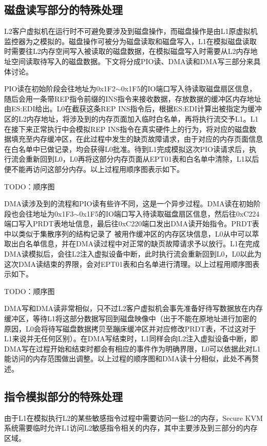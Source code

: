 \subsection{磁盘读写部分的特殊处理}

L2客户虚拟机在运行时不可避免要涉及到磁盘操作，而磁盘操作是由L1原虚拟机监控器为之模拟的。磁盘操作可被分为磁盘读取和磁盘写入，L1在模拟磁盘读取时需要往L2内存空间写入被读取的磁盘数据，在模拟磁盘写入时需要从L2内存地址空间读取待写入的磁盘数据。下文将分成PIO读、DMA读和DMA写三部分来具体讨论。

PIO读在初始阶段会往地址为0x1F2$\sim$0x1F5的IO端口写入待读取磁盘扇区信息，随后会用一条带REP指令前缀的INS指令来接收数据，存放数据的缓冲区内存地址由ES:EDI给出。L0在截获这条REP INS指令后，根据ES:EDI计算出被指定为缓冲区的L2内存地址，将涉及到的内存页面加入临时白名单，再将执行流交予L1。L1在接下来正常执行中会模拟REP INS指令在真实硬件上的行为，将对应的磁盘数据填充至内存缓冲区，在此过程中发生的缺页故障请求，由于对应的内存页面信息在白名单中已做记录，均会获得L0批准。待到L1完成模拟这次PIO读请求后，执行流会重新回到L0，L0再将这部分内存页面从EPT01表和白名单中清除，L1以后便不能再访问这部分内存。以上过程用顺序图表示如下。

TODO：顺序图

DMA读涉及到的流程和PIO读有些许不同，这是一个异步过程。DMA读在初始阶段也会往地址为0x1F3$\sim$0x1F5的IO端口写入待读取磁盘扇区信息，然后往0xC224端口写入PRDT表地址信息，最后往0xC220端口发出DMA读开始指令。PRDT表中以类似于集散序列的结构记录了
被用作缓冲区的内存区块信息，L0从中可以萃取出白名单信息，并在DMA读过程中对正常的缺页故障请求予以放行。L1在完成DMA读模拟后，会往L2注入虚拟设备中断，此时执行流会重新回到L0，L0以此为这次DMA读结束的界限，会对EPT01表和白名单进行清理。以上过程用顺序图表示如下。

TODO：顺序图

DMA写和DMA读非常相似，只不过L2客户虚拟机会事先准备好待写数据放在内存缓冲区，等待L1将这部分数据写回到磁盘映像中（出于不能在原地址进行加密的原因，L0会将待写磁盘数据拷贝至蹦床缓冲区并对应修改PRDT表，不过这对于L1来说并无任何区别）。在DMA写结束时，L1同样会向L2注入虚拟设备中断，即DMA写在过程开始和结束时都会有相应的事件作为明确界限，L0可以依据此对L1能访问的内存范围做出调整。以上过程的顺序图和DMA读十分相似，此处不再赘述。

\subsection{指令模拟部分的特殊处理}

由于L1在模拟执行L2的某些敏感指令过程中需要访问一些L2的内存，Secure KVM系统需要临时允许L1访问L2敏感指令相关的内存，其中主要涉及到三部分的内存区域。

